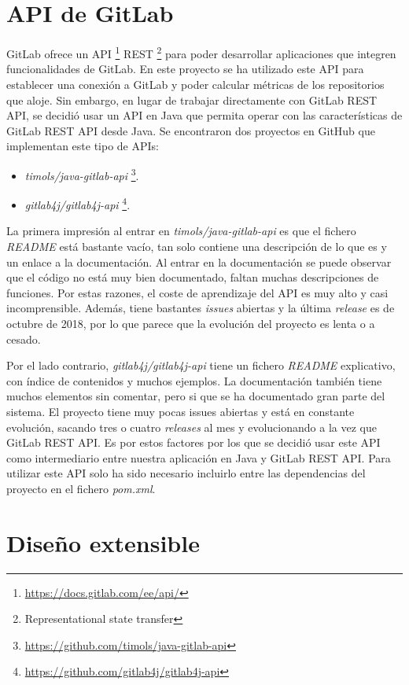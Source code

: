 \section{API de GitLab}

GitLab ofrece un API \footnote{\url{https://docs.gitlab.com/ee/api/}} REST \footnote{Representational state transfer} para poder desarrollar aplicaciones que integren funcionalidades de GitLab. En este proyecto se ha utilizado este API para establecer una conexión a GitLab y poder calcular métricas de los repositorios que aloje. Sin embargo, en lugar de trabajar directamente con GitLab REST API, se decidió usar un API en Java que permita operar con las características de GitLab REST API desde Java. Se encontraron dos proyectos en GitHub que implementan este tipo de APIs:
\begin{itemize}
	\tightlist
	\item \textit{timols/java-gitlab-api} \footnote{\url{https://github.com/timols/java-gitlab-api}}. 
	\item  \textit{gitlab4j/gitlab4j-api} \footnote{\url{https://github.com/gitlab4j/gitlab4j-api}}.
\end{itemize}

La primera impresión al entrar en \textit{timols/java-gitlab-api} es que el fichero \textit{README} está bastante vacío, tan solo contiene una descripción de lo que es y un enlace a la documentación. Al entrar en la documentación se puede observar que el código no está muy bien documentado, faltan muchas descripciones de funciones. Por estas razones, el coste de aprendizaje del API es muy alto y casi incomprensible. Además, tiene bastantes \textit{issues} abiertas y la última \textit{release} es de octubre de 2018, por lo que parece que la evolución del proyecto es lenta o a cesado.

Por el lado contrario, \textit{gitlab4j/gitlab4j-api} tiene un fichero \textit{README} explicativo, con índice de contenidos y muchos ejemplos. La documentación también tiene muchos elementos sin comentar, pero si que se ha documentado gran parte del sistema. El proyecto tiene muy pocas issues abiertas y está en constante evolución, sacando tres o cuatro \textit{releases} al mes y evolucionando a la vez que GitLab REST API. Es por estos factores por los que se decidió usar este API como intermediario entre nuestra aplicación en Java y GitLab REST API. Para utilizar este API solo ha sido necesario incluirlo entre las dependencias del proyecto en el fichero \textit{pom.xml}. 

\section{Diseño extensible}

